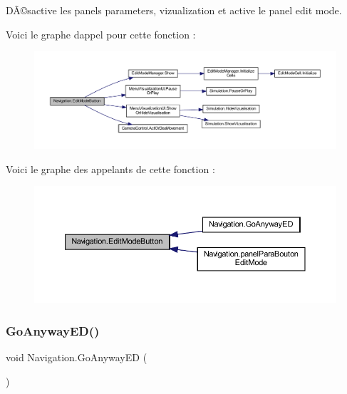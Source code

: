 DÃ©sactive les panels parameters, vizualization et active le panel edit mode. 

Voici le graphe d\textquotesingle{}appel pour cette fonction \+:\nopagebreak
\begin{figure}[H]
\begin{center}
\leavevmode
\includegraphics[width=350pt]{class_navigation_af687f3df18da0e95175b04fe5cc7da56_cgraph}
\end{center}
\end{figure}
Voici le graphe des appelants de cette fonction \+:\nopagebreak
\begin{figure}[H]
\begin{center}
\leavevmode
\includegraphics[width=350pt]{class_navigation_af687f3df18da0e95175b04fe5cc7da56_icgraph}
\end{center}
\end{figure}
\mbox{\label{class_navigation_a17942535e76d66a1d290f9e7a2bc03ec}} 
\subsubsection{\texorpdfstring{Go\+Anyway\+E\+D()}{GoAnywayED()}}
{\footnotesize\ttfamily void Navigation.\+Go\+Anyway\+ED (\begin{DoxyParamCaption}{ }\end{DoxyParamCaption})\hspace{0.3cm}{\ttfamily [inline]}}



